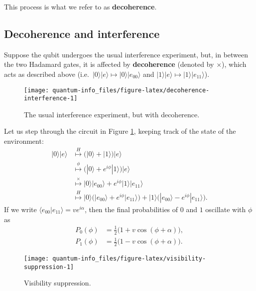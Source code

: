 \documentclass[fleqn]{article}
\begin{document}
This process is what we refer to as \textbf{decoherence}.

\hypertarget{decoherence-and-interference}{%
\subsection{Decoherence and interference}\label{decoherence-and-interference}}

Suppose the qubit undergoes the usual interference experiment, but, in between the two Hadamard gates, it is affected by \textbf{decoherence} (denoted by \(\times\)), which acts as described above (i.e.~\(|0\rangle|e\rangle\mapsto|0\rangle|e_{00}\rangle\) and \(|1\rangle|e\rangle\mapsto|1\rangle|e_{11}\rangle\)).

\begin{figure}[H]

{\centering \texttt{[image: quantum-info\_files/figure-latex/decoherence-interference-1]} 

}

\caption{The usual interference experiment, but with decoherence.}\label{fig:decoherence-interference}
\end{figure}

Let us step through the circuit in Figure \ref{fig:decoherence-interference}, keeping track of the state of the environment:
\[
  \begin{aligned}
    |0\rangle|e\rangle
    & \overset{H}{\longmapsto} \Big( |0\rangle + |1\rangle \Big) |e\rangle
  \\& \overset{\phi}{\longmapsto} \Big( |0\rangle + e^{i\phi}|1\rangle \Big) |e\rangle
  \\& \overset{\times}{\longmapsto} |0\rangle|e_{00}\rangle + e^{i\phi}|1\rangle|e_{11}\rangle
  \\& \overset{H}{\longmapsto} |0\rangle\Big( |e_{00}\rangle + e^{i\phi}|e_{11}\rangle \Big) + |1\rangle\Big( |e_{00}\rangle - e^{i\phi}|e_{11}\rangle \Big).
  \end{aligned}
\]
If we write \(\langle e_{00}|e_{11}\rangle = ve^{i\alpha}\), then the final probabilities of \(0\) and \(1\) oscillate with \(\phi\) as
\[
  \begin{aligned}
    P_{0}(\phi) &= \frac12\big(1 + v\cos(\phi + \alpha)\big),
  \\P_{1}(\phi) &= \frac12\big(1 - v\cos(\phi + \alpha)\big).
  \end{aligned}
\]

\begin{figure}[H]

{\centering \texttt{[image: quantum-info\_files/figure-latex/visibility-suppression-1]} 

}

\caption{Visibility suppression.}\label{fig:visibility-suppression}
\end{figure}
\end{document}
